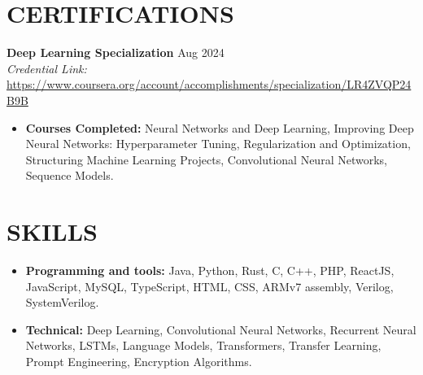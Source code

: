 \documentclass[a4paper,1.5pt]{extarticle}
\begin{document}
\section*{CERTIFICATIONS}
\noindent
\textbf{Deep Learning Specialization} \hfill Aug 2024 \\
\textit{Credential Link:} \url{https://www.coursera.org/account/accomplishments/specialization/LR4ZVQP24B9B}
\begin{itemize}
    \item \textbf{Courses Completed:} Neural Networks and Deep Learning, Improving Deep Neural Networks: Hyperparameter Tuning, Regularization and Optimization, Structuring Machine Learning Projects, Convolutional Neural Networks, Sequence Models.
    
\end{itemize}
\section*{SKILLS}
\begin{itemize}
    \item \textbf{Programming and tools:} Java, Python, Rust, C, C++, PHP, ReactJS, JavaScript, MySQL, TypeScript, HTML, CSS, ARMv7 assembly, Verilog, SystemVerilog.
    \item \textbf{Technical:} Deep Learning, Convolutional Neural Networks, Recurrent Neural Networks, LSTMs, Language Models, Transformers, Transfer Learning, Prompt Engineering, Encryption Algorithms. 
\end{itemize}

\end{document}
